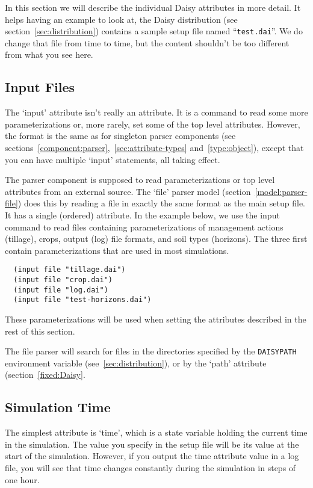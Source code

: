 In this section we will describe the individual Daisy attributes in
more detail.  It helps having an example to look at, the Daisy
distribution (see section~\ref{sec:distribution}) contains a sample
setup file named ``\texttt{test.dai}''.  We do change that file from
time to time, but the content shouldn't be too different from what you
see here.

\subsection{Input Files}
\label{sec:daisy-input}

The `input' attribute isn't really an attribute.  It is a command to
read some more parameterizations or, more rarely, set some of the top
level attributes.  However, the format is the same as for singleton
parser components (see
sections~\ref{component:parser},~\ref{sec:attribute-types}
and~\ref{type:object}), except that you can have multiple `input'
statements, all taking effect.

The parser component is supposed to read parameterizations or top
level attributes from an external source.  The `file' parser model
(section~\ref{model:parser-file}) does this by reading a file in
exactly the same format as the main setup file.  It has a single
(ordered) attribute.  In the example below, we use the input command
to read files containing parameterizations of management actions
(tillage), crops, output (log) file formats, and soil types
(horizons).  The three first contain parameterizations that are used
in most simulations.

\begin{verbatim}
  (input file "tillage.dai")
  (input file "crop.dai")
  (input file "log.dai")
  (input file "test-horizons.dai")
\end{verbatim}

These parameterizations will be used when setting the attributes
described in the rest of this section.

The file parser will search for files in the directories specified by
the \texttt{DAISYPATH} environment variable
(see~\ref{sec:distribution}), or by the `path' attribute
(section~\ref{fixed:Daisy}. 

\subsection{Simulation Time}

The simplest attribute is `time', which is a state variable holding
the current time in the simulation.  The value you specify in the
setup file will be its value at the start of the simulation.
However, if you output the time attribute value in a log file, you will
see that time changes constantly during the simulation in steps of one
hour.

